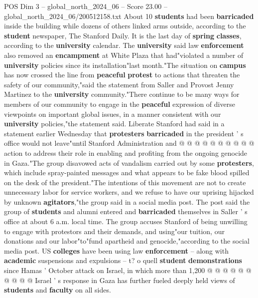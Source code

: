 \begin{textsample}{POS Dim 3 – global\_north\_2024\_06 – Score 23.00 – global\_north\_2024\_06/200512158.txt}
About 10 \textbf{students} had been \textbf{barricaded} inside the building while dozens of others linked arms outside, according to the \textbf{student} newspaper, The Stanford Daily.
It is the last day of \textbf{spring} \textbf{classes}, according to the \textbf{university} calendar.
The \textbf{university} said law \textbf{enforcement} also removed an \textbf{encampment} at White Plaza that had"violated a number of \textbf{university} policies since its installation"last month."The situation on \textbf{campus} has now crossed the line from \textbf{peaceful} \textbf{protest} to actions that threaten the safety of our community,"said the statement from Saller and Provost Jenny Martinez to the \textbf{university} community."There continue to be many ways for members of our community to engage in the \textbf{peaceful} expression of diverse viewpoints on important global issues, in a manner consistent with our \textbf{university} policies,"the statement said.
Liberate Stanford had said in a statement earlier Wednesday that \textbf{protesters} \textbf{barricaded} in the president ' s office would not leave"until Stanford Administration and @ @ @ @ @ @ @ @ @ @ action to address their role in enabling and profiting from the ongoing genocide in Gaza."The group disavowed acts of vandalism carried out by some \textbf{protesters}, which include spray-painted messages and what appears to be fake blood spilled on the desk of the president."The intentions of this movement are not to create unnecessary labor for service workers, and we refuse to have our uprising hijacked by unknown \textbf{agitators},"the group said in a social media post.
The post said the group of \textbf{students} and alumni entered and \textbf{barricaded} themselves in Saller ' s office at about 6 a.m. local time.
The group accuses Stanford of being unwilling to engage with protestors and their demands, and using"our tuition, our donations and our labor"to"fund apartheid and genocide,"according to the social media post.
US \textbf{colleges} have been using law \textbf{enforcement} -- along with \textbf{academic} suspensions and expulsions -- t? o quell \textbf{student} \textbf{demonstrations} since Hamas ' October attack on Israel, in which more than 1,200 @ @ @ @ @ @ @ @ @ @ Israel ' s response in Gaza has further fueled deeply held views of \textbf{students} and \textbf{faculty} on all sides.

\end{textsample}

